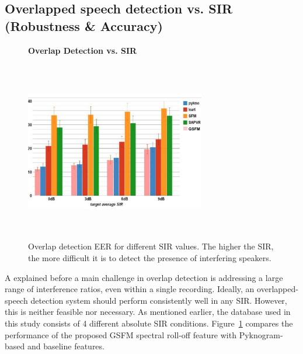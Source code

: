 {\subsection{Overlapped speech detection vs. SIR (Robustness \& Accuracy)}
\label{sssec:ovl_frame_vs_sir_gsfm}
\begin{figure}[b!]
	\centering
	\hspace{-1mm}
	\textbf{Overlap Detection vs. SIR}\par\medskip
	\includegraphics[height = 3.1in, width=0.7\textwidth]{figures/ovl_det_vs_sir_gsfm}
	\vspace{-1mm}
	\caption{Overlap detection EER for different SIR values. The higher the SIR, the more difficult it is to detect the presence of interfering speakers.}
	\vspace{0mm}
	\label{fig:ovl_det_gsfm}
\end{figure}

A explained before a main challenge in overlap detection is addressing a large range of interference ratios, even within a single recording. 
Ideally, an overlapped-speech detection system should perform consistently well in any SIR. 
However, this is neither feasible nor necessary. 
As mentioned earlier, the database used in this study consists of 4 different absolute SIR conditions. 
Figure~\ref{fig:ovl_det_gsfm} compares the performance of the proposed GSFM spectral roll-off feature with Pyknogram-based and baseline features.

}
